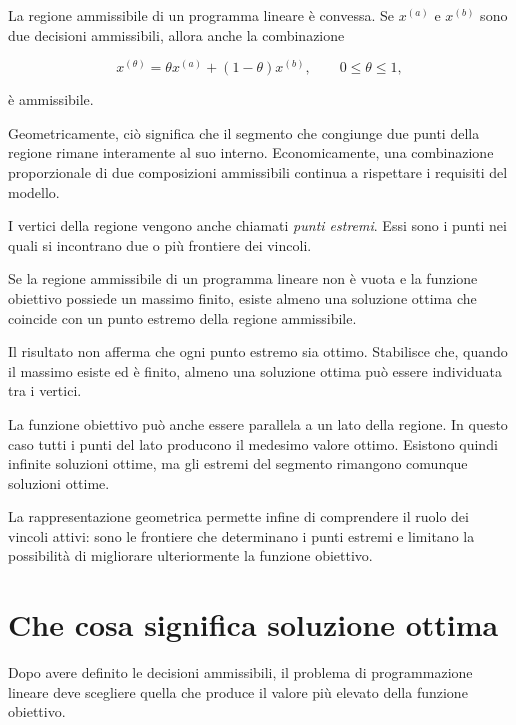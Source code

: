 La regione ammissibile di un programma lineare \`e convessa. Se
$x^{(a)}$ e $x^{(b)}$ sono due decisioni ammissibili, allora anche la
combinazione

\[
x^{(\theta)}
=
\theta x^{(a)}
+
(1-\theta)x^{(b)},
\qquad
0\leq\theta\leq1,
\]

\noindent \`e ammissibile.

Geometricamente, ci\`o significa che il segmento che congiunge due punti
della regione rimane interamente al suo interno. Economicamente, una
combinazione proporzionale di due composizioni ammissibili continua a
rispettare i requisiti del modello.

I vertici della regione vengono anche chiamati \emph{punti estremi}. Essi sono
i punti nei quali si incontrano due o pi\`u frontiere dei vincoli.

\begin{proposition}

Se la regione ammissibile di un programma lineare non \`e vuota e la funzione
obiettivo possiede un massimo finito, esiste almeno una soluzione ottima che
coincide con un punto estremo della regione ammissibile.

\end{proposition}

Il risultato non afferma che ogni punto estremo sia ottimo. Stabilisce che,
quando il massimo esiste ed \`e finito, almeno una soluzione ottima pu\`o
essere individuata tra i vertici.

La funzione obiettivo pu\`o anche essere parallela a un lato della regione.
In questo caso tutti i punti del lato producono il medesimo valore ottimo.
Esistono quindi infinite soluzioni ottime, ma gli estremi del segmento
rimangono comunque soluzioni ottime.

La rappresentazione geometrica permette infine di comprendere il ruolo dei
vincoli attivi: sono le frontiere che determinano i punti estremi e limitano
la possibilit\`a di migliorare ulteriormente la funzione obiettivo.

\section{Che cosa significa soluzione ottima}

\label{sec:cap11-significato-ottimo}

Dopo avere definito le decisioni ammissibili, il problema di programmazione
lineare deve scegliere quella che produce il valore pi\`u elevato della
funzione obiettivo.

